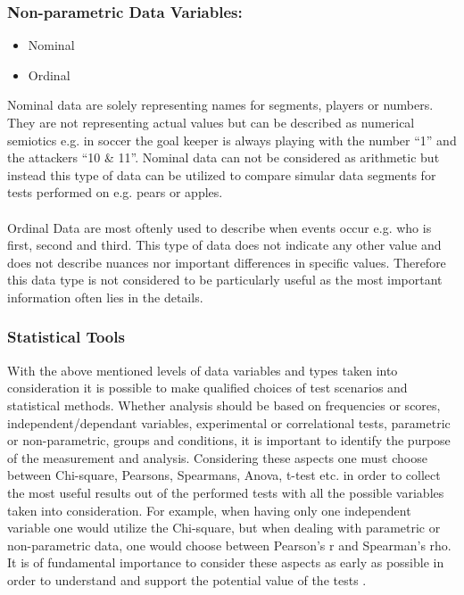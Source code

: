 \subsubsection{Non-parametric Data Variables:}
\begin{itemize}
\item Nominal
\item Ordinal
\end{itemize}
Nominal data are solely representing names for segments, players or numbers. They are not representing actual values but can be described as numerical semiotics e.g. in soccer the goal keeper is always playing with the number “1” and the attackers “10 \& 11”. Nominal data can not be considered as arithmetic but instead this type of data can be utilized to compare simular data segments for tests performed on e.g. pears or apples.\\\\
Ordinal Data are most oftenly used to describe when events occur e.g. who is first, second and third. This type of data does not indicate any other value and does not describe nuances nor important differences in specific values. Therefore this data type is not considered to be particularly useful as the most important information often lies in the details. 
\subsubsection{Statistical Tools}
With the above mentioned levels of data variables and types taken into consideration it is possible to make qualified choices of test scenarios and statistical methods. Whether analysis should be based on frequencies or scores, independent/dependant variables, experimental or correlational tests, parametric or non-parametric, groups and conditions, it is important to identify the purpose of the measurement and analysis. Considering these aspects one must choose between Chi-square, Pearsons, Spearmans, Anova, t-test etc. in order to collect the most useful results out of the performed tests with all the possible variables taken into consideration. For example, when having only one independent variable one would utilize the Chi-square, but when dealing with parametric or non-parametric data, one would choose between Pearson’s r and Spearman’s rho. It is of fundamental importance to consider these aspects as early as possible in order to understand and support the potential value of the tests \citep[page 274]{Design}.
